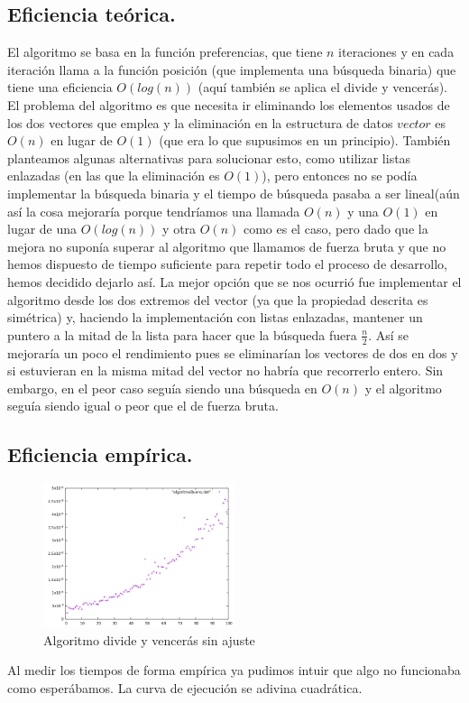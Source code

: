 \documentclass[a4paper, 11pt]{article}
\begin{document}
\subsection{Eficiencia teórica.}
El algoritmo se basa en la función preferencias, que tiene $n$ iteraciones y en cada iteración llama a la función posición (que implementa una búsqueda binaria) que tiene una eficiencia $O(log(n))$ (aquí también se aplica el divide y vencerás). El problema del algoritmo es que necesita ir eliminando los elementos usados de los dos vectores que emplea y la eliminación en la estructura de datos $vector$ es $O(n)$ en lugar de $O(1)$ (que era lo que supusimos en un principio). También planteamos algunas alternativas para solucionar esto, como utilizar listas enlazadas (en las que la eliminación es $O(1)$), pero entonces no se podía implementar la búsqueda binaria y el tiempo de búsqueda pasaba a ser lineal(aún así la cosa mejoraría porque tendríamos una llamada $O(n)$ y una $O(1)$ en lugar de una $O(log(n))$ y otra $O(n)$ como es el caso, pero dado que la mejora no suponía superar al algoritmo que llamamos de fuerza bruta y que no hemos dispuesto de tiempo suficiente para repetir todo el proceso de desarrollo, hemos decidido dejarlo así. La mejor opción que se nos ocurrió fue implementar el algoritmo desde los dos extremos del vector (ya que la propiedad descrita es simétrica) y, haciendo la implementación con listas enlazadas, mantener un puntero a la mitad de la lista para hacer que la búsqueda fuera $\frac{n}{2}$. Así se mejoraría un poco el rendimiento pues se eliminarían los vectores de dos en dos y si estuvieran en la misma mitad del vector no habría que recorrerlo entero. Sin embargo, en el peor caso seguía siendo una búsqueda en $O(n)$ y el algoritmo seguía siendo igual o peor que el de fuerza bruta.

\subsection{Eficiencia empírica.}
\begin{figure}[!hbp]
	\includegraphics[width=0.5\textwidth]{algBueno.png}
	\caption{Algoritmo divide y vencerás sin ajuste	\label{Algoritmo divide y vencerás análisis empírico}}
\end{figure}
Al medir los tiempos de forma empírica ya pudimos intuir que algo no funcionaba como esperábamos. La curva de ejecución se adivina cuadrática.
\end{document}
